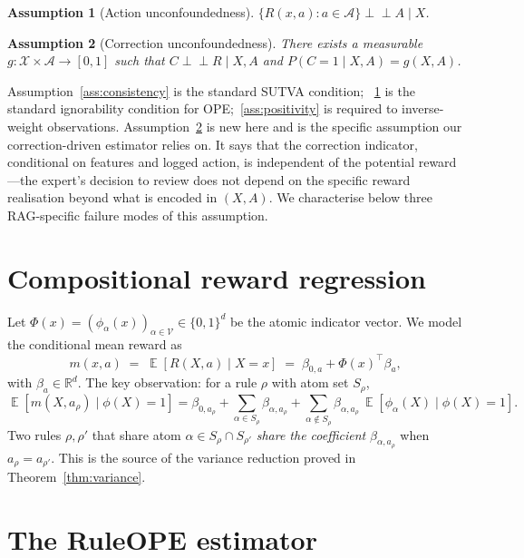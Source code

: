\documentclass[11pt]{article}
\newtheorem{assumption}{Assumption}
\DeclareMathOperator{\E}{\mathbb{E}}
\newcommand{\indep}{\perp\!\!\!\perp}
\begin{document}
\begin{assumption}[Action unconfoundedness]\label{ass:action-uncon}
$\{R(x, a) : a \in \mathcal{A}\} \indep A \mid X$.
\end{assumption}

\begin{assumption}[Correction unconfoundedness]\label{ass:corr-uncon}
There exists a measurable $g: \mathcal{X} \times \mathcal{A} \to [0,1]$
such that $C \indep R \mid X, A$ and $P(C = 1 \mid X, A) = g(X, A)$.
\end{assumption}

Assumption~\ref{ass:consistency} is the standard SUTVA condition;
~\ref{ass:action-uncon} is the standard ignorability condition for
OPE;~\ref{ass:positivity} is required to inverse-weight observations.
Assumption~\ref{ass:corr-uncon} is new here and is the specific
assumption our correction-driven estimator relies on.  It says that
the correction indicator, conditional on features and logged action,
is independent of the potential reward---the expert's decision to
review does not depend on the specific reward realisation beyond what
is encoded in $(X, A)$.  We characterise below three RAG-specific
failure modes of this assumption.

\section{Compositional reward regression}

Let $\Phi(x) = (\phi_\alpha(x))_{\alpha \in \mathcal{V}} \in \{0, 1\}^d$
be the atomic indicator vector.  We model the conditional mean reward
as
\begin{equation}
m(x, a) \;=\; \E[R(X, a) \mid X = x] \;=\; \beta_{0, a} + \Phi(x)^\top \beta_a,
\label{eq:reg}
\end{equation}
with $\beta_a \in \mathbb{R}^d$.  The key observation: for a rule
$\rho$ with atom set $S_\rho$,
\begin{equation*}
\E[m(X, a_\rho) \mid \phi(X) = 1] = \beta_{0, a_\rho}
  + \sum_{\alpha \in S_\rho} \beta_{\alpha, a_\rho}
  + \sum_{\alpha \notin S_\rho} \beta_{\alpha, a_\rho}\, \E[\phi_\alpha(X) \mid \phi(X) = 1].
\end{equation*}
Two rules $\rho, \rho'$ that share atom $\alpha \in S_\rho \cap S_{\rho'}$
\emph{share the coefficient} $\beta_{\alpha, a_\rho}$ when $a_\rho =
a_{\rho'}$.  This is the source of the variance reduction proved in
Theorem~\ref{thm:variance}.

\section{The RuleOPE estimator}
\end{document}
